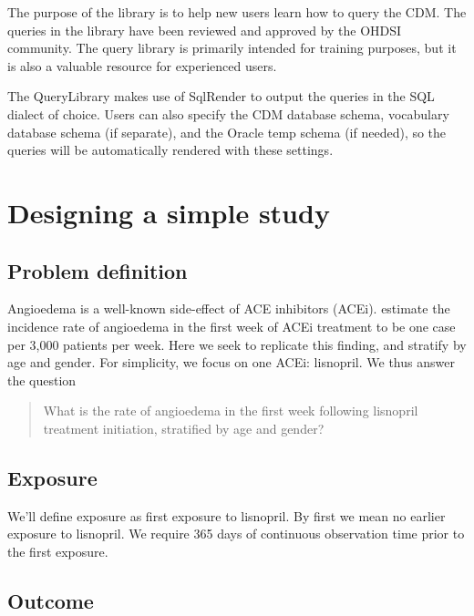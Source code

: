 \documentclass[11pt]{book}
\theoremstyle{definition}
\theoremstyle{definition}
\theoremstyle{definition}
\theoremstyle{remark}
\begin{document}
The purpose of the library is to help new users learn how to query the CDM. The queries in the library have been reviewed and approved by the OHDSI community. The query library is primarily intended for training purposes, but it is also a valuable resource for experienced users.

The QueryLibrary makes use of SqlRender to output the queries in the SQL dialect of choice. Users can also specify the CDM database schema, vocabulary database schema (if separate), and the Oracle temp schema (if needed), so the queries will be automatically rendered with these settings.

\hypertarget{designing-a-simple-study}{%
\section{Designing a simple study}\label{designing-a-simple-study}}

\hypertarget{problem-definition}{%
\subsection{Problem definition}\label{problem-definition}}

Angioedema is a well-known side-effect of ACE inhibitors (ACEi). \citet{slater_1988} estimate the incidence rate of angioedema in the first week of ACEi treatment to be one case per 3,000 patients per week. Here we seek to replicate this finding, and stratify by age and gender. For simplicity, we focus on one ACEi: lisnopril. We thus answer the question

\begin{quote}
What is the rate of angioedema in the first week following lisnopril treatment initiation, stratified by age and gender?
\end{quote}

\hypertarget{exposure}{%
\subsection{Exposure}\label{exposure}}

We'll define exposure as first exposure to lisnopril. By first we mean no earlier exposure to lisnopril. We require 365 days of continuous observation time prior to the first exposure.

\hypertarget{outcome}{%
\subsection{Outcome}\label{outcome}}
\end{document}
